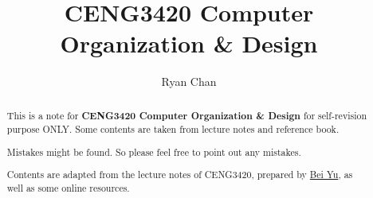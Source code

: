 \documentclass[a4paper]{report}
\author{Ryan Chan}
\title{CENG3420 Computer Organization \& Design}
\begin{document}
\setlength\parindent{0pt}

\maketitle

\newpage

\begin{abstract}
	This is a note for \textbf{CENG3420 Computer Organization \& Design} for self-revision purpose ONLY. Some contents are taken from lecture notes and reference book.
	
	Mistakes might be found. So please feel free to point out any mistakes.
	
	Contents are adapted from the lecture notes of CENG3420, prepared by \href{https://www.cse.cuhk.edu.hk/~byu/}{Bei Yu}, as well as some online resources.
\end{abstract}

\newpage

\tableofcontents

\setlength{\parskip}{5pt}
\end{document}
